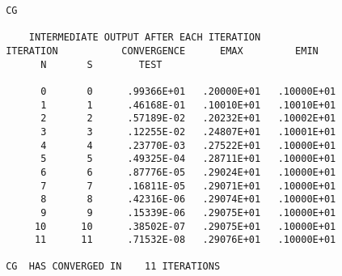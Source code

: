 \begin{verbatim}
 CG
 
     INTERMEDIATE OUTPUT AFTER EACH ITERATION
 ITERATION           CONVERGENCE      EMAX         EMIN
       N       S        TEST
 
       0       0      .99366E+01   .20000E+01   .10000E+01
       1       1      .46168E-01   .10010E+01   .10010E+01
       2       2      .57189E-02   .20232E+01   .10002E+01
       3       3      .12255E-02   .24807E+01   .10001E+01
       4       4      .23770E-03   .27522E+01   .10000E+01
       5       5      .49325E-04   .28711E+01   .10000E+01
       6       6      .87776E-05   .29024E+01   .10000E+01
       7       7      .16811E-05   .29071E+01   .10000E+01
       8       8      .42316E-06   .29074E+01   .10000E+01
       9       9      .15339E-06   .29075E+01   .10000E+01
      10      10      .38502E-07   .29075E+01   .10000E+01
      11      11      .71532E-08   .29076E+01   .10000E+01
 
 CG  HAS CONVERGED IN    11 ITERATIONS
 
\end{verbatim}
\newpage
